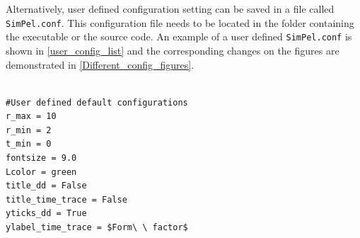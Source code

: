 \documentclass[pdftex,bezier,german,a4,twoside, headexclude,12pt,nochapterprefix, titlepage]{extarticle}
\begin{document}
Alternatively, user defined configuration setting can be saved in a file called \texttt{SimPel.conf}. This configuration file needs to be located in the folder containing the executable or the source code. An example of a user defined \texttt{SimPel.conf} is shown in \autoref{user_config_list} and the corresponding changes on the figures are demonstrated in \autoref{Different_config_figures}.

\newpage

\begin{lstlisting}[caption={Example for a user defined configuration file (\texttt{SimPel.conf}).},label = user_config_list]

#User defined default configurations 
r_max = 10
r_min = 2
t_min = 0
fontsize = 9.0
Lcolor = green
title_dd = False
title_time_trace = False
yticks_dd = True
ylabel_time_trace = $Form\ \ factor$
\end{lstlisting}
\end{document}

